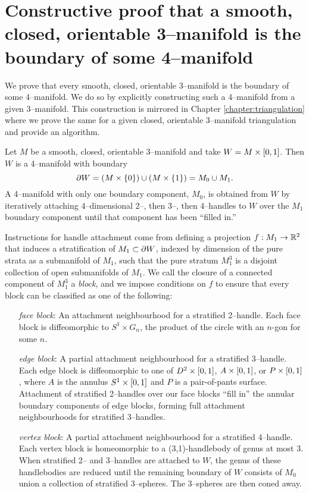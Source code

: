 \chapter[Smooth]{Constructive proof that a smooth, closed, orientable 3--manifold is the boundary of some 4--manifold}
\label{chapter:smooth}

We prove that every smooth, closed, orientable 3--manifold is the boundary of some 4--manifold.
We do so by explicitly constructing such a 4--manifold from a given 3--manifold.
This construction is mirrored in Chapter \ref{chapter:triangulation} where we prove the same for a given closed, orientable 3--manifold triangulation and provide an algorithm.

Let $M$ be a smooth, closed, orientable 3--manifold and take $W=M\times [0,1]$.
Then $W$ is a 4--manifold with boundary
\[
	\partial W = (M\times\{0\}) \cup (M\times\{1\}) = M_0 \cup M_1.
\]
A 4--manifold with only one boundary component, $M_0$, is obtained from $W$ by iteratively attaching 4--dimensional 2--, then 3--, then 4--handles to $W$ over the $M_1$ boundary component until that component has been ``filled in.''

Instructions for handle attachment come from defining a projection $f:M_1\to \mathbb{R}^2$ that induces a stratification of $M_1\subset\partial W$, indexed by dimension of the pure strata as a submanifold of $M_1$, such that the pure stratum $M_1^3$ is a disjoint collection of open submanifolds of $M_1$.
We call the closure of a connected component of $M_1^3$ a \emph{block}, and we impose conditions on $f$ to ensure that every block can be classified as one of the following:
\begin{enumerate}
	\item[\emph{face block}:]
		An attachment neighbourhood for a stratified 2--handle.
		Each face block is diffeomorphic to $S^1\times G_n$, the product of the circle with an $n$-gon for some $n$.
	
	\item[\emph{edge block}:]
		A partial attachment neighbourhood for a stratified 3--handle.
		Each edge block is diffeomorphic to one of $D^2\times[0,1]$, $A\times[0,1]$, or $P\times[0,1]$, where $A$ is the annulus $S^1\times[0,1]$ and $P$ is a pair-of-pants surface.
		Attachment of stratified 2--handles over our face blocks ``fill in'' the annular boundary components of edge blocks, forming full attachment neighbourhoods for stratified 3--handles.
		
	\item[\emph{vertex block}:]
		A partial attachment neighbourhood for a stratified 4--handle.
		Each vertex block is homeomorphic to a (3,1)-handlebody of genus at most 3.
		When stratified 2-- and 3--handles are attached to $W$, the genus of these handlebodies are reduced until the remaining boundary of $W$ consists of $M_0$ union a collection of stratified 3--spheres.  The 3--spheres are then coned away.
\end{enumerate}
 

